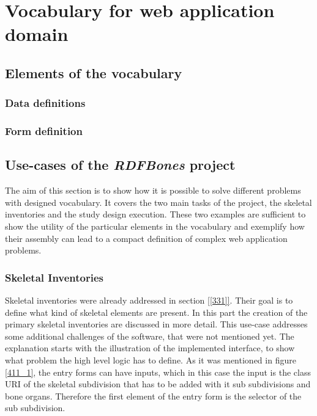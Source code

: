 \chapter{Vocabulary for web application domain}


\section{Elements of the vocabulary}

\subsection{Data definitions}



\subsection{Form definition}



\section{Use-cases of the \textit{RDFBones} project}

The aim of this section is to show how it is possible to solve different problems with designed vocabulary. It covers the two main tasks of the project, the skeletal inventories and the study design execution. These two examples are sufficient to show the utility of the particular elements in the vocabulary and exemplify how their assembly can lead to a compact definition of complex web application problems.

\subsection{Skeletal Inventories}

Skeletal inventories were already addressed in section \ref{[331]}. Their goal is to define what kind of skeletal elements are present. In this part the creation of the primary skeletal inventories are discussed in more detail. This use-case addresses some additional challenges of the software, that were not mentioned yet.
The explanation starts with the illustration of the implemented interface, to show what problem the high level logic has to define. As it was mentioned in figure \ref{411_1}, the entry forms can have inputs, which in this case the input is the class URI of the skeletal subdivision that has to be added with it sub subdivisions and bone organs. Therefore the first element of the entry form is the selector of the sub subdivision.



